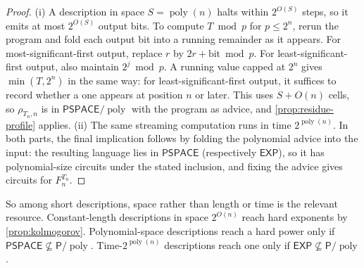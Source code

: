 \documentclass[11pt]{article}
\theoremstyle{definition}
\theoremstyle{remark}
\newcommand{\poly}{\operatorname{poly}}
\numberwithin{equation}{section}
\begin{document}
\begin{proof}
(i) A description in space $S=\poly(n)$ halts within $2^{O(S)}$ steps,
so it emits at most $2^{O(S)}$ output bits.  To compute $T\bmod p$ for
$p\leq 2^n$, rerun the program and fold each output bit into a running
remainder as it appears.  For most-significant-first output, replace
$r$ by $2r+\text{bit}\bmod p$.  For least-significant-first output, also
maintain $2^j\bmod p$.  A running value capped at $2^n$ gives
$\min(T,2^n)$ in the same way: for least-significant-first output, it
suffices to record whether a one appears at position $n$ or later.  This uses $S+O(n)$ cells, so $\rho_{T_n,n}$ is in
$\mathsf{PSPACE}/\poly$ with the program as advice, and
\cref{prop:residue-profile} applies.
(ii) The same streaming computation runs in time $2^{\poly(n)}$.
In both parts, the final implication follows by folding the polynomial
advice into the input: the resulting language lies in $\mathsf{PSPACE}$
(respectively $\mathsf{EXP}$), so it has polynomial-size circuits under
the stated inclusion, and fixing the advice gives circuits for
$F_n^{T_n}$.
\end{proof}

So among short descriptions, space rather than length or time is the
relevant resource.  Constant-length descriptions in space $2^{O(n)}$
reach hard exponents by \cref{prop:kolmogorov}.  Polynomial-space
descriptions reach a hard power only if
$\mathsf{PSPACE}\not\subseteq\mathsf{P}/\poly$.  Time-$2^{\poly(n)}$
descriptions reach one only if
$\mathsf{EXP}\not\subseteq\mathsf{P}/\poly$.
\end{document}
